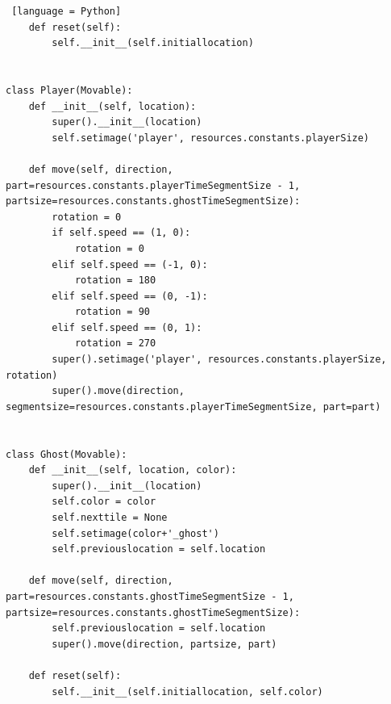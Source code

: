 \documentclass[11pt,a4paper,notitlepage]{report}
\begin{document}
\begin{lstlisting} [language = Python]
    def reset(self):
        self.__init__(self.initiallocation)


class Player(Movable):
    def __init__(self, location):
        super().__init__(location)
        self.setimage('player', resources.constants.playerSize)

    def move(self, direction, part=resources.constants.playerTimeSegmentSize - 1, partsize=resources.constants.ghostTimeSegmentSize):
        rotation = 0
        if self.speed == (1, 0):
            rotation = 0
        elif self.speed == (-1, 0):
            rotation = 180
        elif self.speed == (0, -1):
            rotation = 90
        elif self.speed == (0, 1):
            rotation = 270
        super().setimage('player', resources.constants.playerSize, rotation)
        super().move(direction, segmentsize=resources.constants.playerTimeSegmentSize, part=part)


class Ghost(Movable):
    def __init__(self, location, color):
        super().__init__(location)
        self.color = color
        self.nexttile = None
        self.setimage(color+'_ghost')
        self.previouslocation = self.location

    def move(self, direction, part=resources.constants.ghostTimeSegmentSize - 1, partsize=resources.constants.ghostTimeSegmentSize):
        self.previouslocation = self.location
        super().move(direction, partsize, part)

    def reset(self):
        self.__init__(self.initiallocation, self.color)
			\end{lstlisting}
\end{document}
